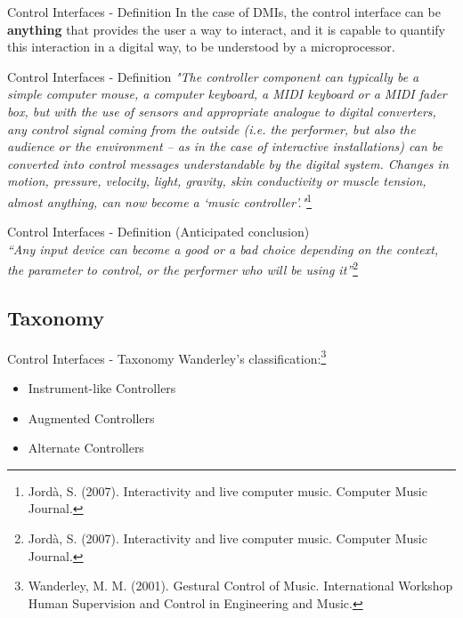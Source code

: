 \documentclass{beamer}
\begin{document}
\begin{frame}{Control Interfaces - Definition}
    In the case of DMIs, the control interface can be \textbf{anything} that provides the user a way to interact, and it is capable to quantify this interaction in a digital way, to be understood by a microprocessor.
\end{frame}

\begin{frame}{Control Interfaces - Definition}
    \textit{"The controller component can typically be a simple computer mouse, a computer keyboard, a MIDI keyboard or a MIDI fader box, but with the use of sensors and appropriate analogue to digital converters, any control signal coming from the outside (i.e. the performer, but also the audience or the environment – as in the case of interactive installations) can be converted into control messages understandable by the digital system. Changes in motion, pressure, velocity, light, gravity, skin conductivity or muscle tension, almost anything, can now become a ‘music controller’."}\footnote{Jordà, S. (2007). Interactivity and live computer music. Computer Music Journal.}
\end{frame}

\begin{frame}{Control Interfaces - Definition}
    (Anticipated conclusion)\\
    \vspace{5mm}
    \textit{“Any input device can become a good or a bad choice depending on the context, the parameter to control, or the performer who will be using it”}\footnote{Jordà, S. (2007). Interactivity and live computer music. Computer Music Journal.}
\end{frame}

\subsection{Taxonomy}

\begin{frame}{Control Interfaces - Taxonomy}
    Wanderley's classification:\footnote{Wanderley, M. M. (2001). Gestural Control of Music. International Workshop Human Supervision and Control in Engineering and Music.} 
    \begin{itemize}
        \item Instrument-like Controllers
        \item Augmented Controllers
        \item Alternate Controllers
    \end{itemize}
\end{frame}
\end{document}
